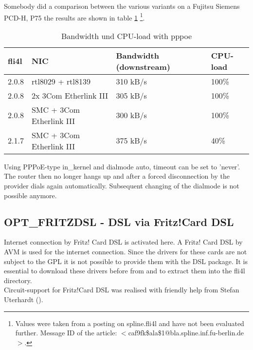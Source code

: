 \begin{description}
Somebody did a comparison between the various variants 
on a Fujitsu Siemens PCD-H, P75 the results are shown in table
\ref{tab:pppoe-type-load} \footnote{Values
  were taken from a posting on spline.fli4l and have not been evaluated
  further. Message ID of the article:
  $<$caf9fk\$ala\$1@bla.spline.inf.fu-berlin.de$>$.}.
\begin{table}[h!]
  \centering
  \begin{tabular}[h]{|l|l|l|l|}
    \hline
    fli4l & NIC & Bandwidth (downstream) & CPU-load \\
    \hline
    2.0.8 & rtl8029 + rtl8139 & 310 kB/s  &100\% \\
    2.0.8 & 2x 3Com Etherlink III & 305 kB/s & 100\% \\
    2.0.8 & SMC + 3Com Etherlink III & 300 kB/s & 100\% \\
    2.1.7 & SMC + 3Com Etherlink III & 375 kB/s & 40\%\\
    \hline
  \end{tabular}
  \caption{Bandwidth und CPU-load with pppoe}
  \label{tab:pppoe-type-load}
\end{table}


Using PPPoE-type in\_kernel and dialmode auto, timeout can be set 
to 'never'. The router then no longer hangs up and after a forced 
disconnection by the provider dials again automatically. Subsequent
changing of the dialmode is not possible anymore.

\end{description}

\subsection {OPT\_FRITZDSL - DSL via Fritz!Card DSL}

Internet connection by Fritz! Card DSL is activated here. A 
Fritz! Card DSL by AVM is used for the internet connection. 
Since the drivers for these cards are not subject to the GPL
it is not possible to provide them with the DSL package. It is
essential to download these drivers before from 
and to extract them into the fli4l directory.\\
      

Circuit-support for Fritz!Card DSL was realised 
with friendly help from Stefan Uterhardt
().


